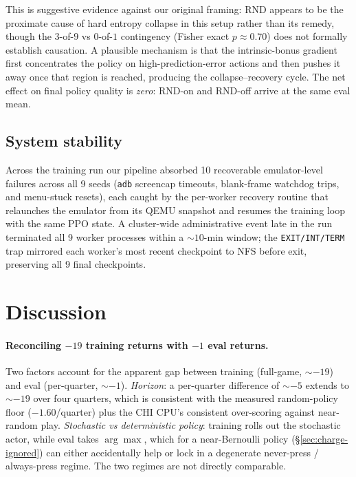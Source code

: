 \documentclass{article}
\begin{document}
This is suggestive evidence against our original framing: RND
appears to be the proximate cause of hard entropy collapse in
this setup rather than its remedy, though the $3$-of-$9$ vs
$0$-of-$1$ contingency (Fisher exact $p \approx 0.70$) does not
formally establish causation. A plausible mechanism is that the
intrinsic-bonus gradient first concentrates the policy on
high-prediction-error actions and then pushes it away once that
region is reached, producing the collapse--recovery cycle. The
net effect on final policy quality is \emph{zero}: RND-on and
RND-off arrive at the same eval mean.

\subsection{System stability}
\label{sec:stability}

Across the training run our pipeline absorbed 10 recoverable
emulator-level failures across all 9 seeds (\texttt{adb}
screencap timeouts, blank-frame watchdog trips, and menu-stuck
resets), each caught by the per-worker recovery routine that
relaunches the emulator from its QEMU snapshot and resumes the
training loop with the same PPO state. A cluster-wide
administrative event late in the run terminated all 9 worker
processes within a $\sim$$10$-min window; the
\texttt{EXIT/INT/TERM} trap mirrored each worker's most recent
checkpoint to NFS before exit, preserving all 9 final
checkpoints.

\section{Discussion}
\label{sec:discussion}

\paragraph{Reconciling $-19$ training returns with $-1$ eval
returns.} Two factors account for the apparent gap between
training (full-game, $\sim$$-19$) and eval (per-quarter,
$\sim$$-1$). \emph{Horizon}: a per-quarter difference of
$\sim$$-5$ extends to $\sim$$-19$ over four quarters, which is
consistent with the measured random-policy floor ($-1.60$/quarter)
plus the CHI CPU's consistent over-scoring against near-random
play. \emph{Stochastic vs deterministic policy}: training rolls
out the stochastic actor, while eval takes $\arg\max$, which for
a near-Bernoulli policy (\S\ref{sec:charge-ignored}) can either
accidentally help or lock in a degenerate never-press / always-press
regime. The two regimes are not directly comparable.
\end{document}
